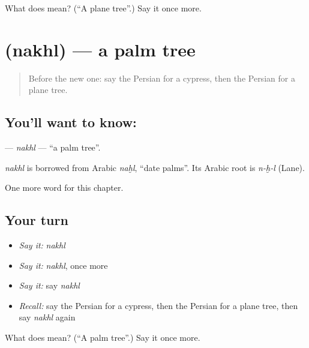 \begin{tcolorbox}[breakable,colback=teal!4,colframe=teal!35!black,title={Before you move on}]
What does  mean? (\textquotedblleft{}A plane tree\textquotedblright{}.) Say it once more.
\end{tcolorbox}
\section[\texorpdfstring{\fa{نخل} (nakhl)}{نخل (nakhl)}]{ (nakhl) — a palm tree}

\label{lesson:FA-C279-nakhl}



\begin{quote}
Before the new one: say the Persian for a cypress, then the Persian for a plane tree.
\end{quote}

\subsection*{You'll want to know: }
\textbf{} — \emph{nakhl} — \textquotedblleft{}a palm tree\textquotedblright{}.

\begin{cousinweb}
\emph{nakhl} is borrowed from Arabic \emph{naḫl}, \textquotedblleft{}date palms\textquotedblright{}. Its Arabic root is \emph{n-ḫ-l} (Lane).
\end{cousinweb}

\begin{grammarlens}[title={What you've built}]
One more word for this chapter.
\end{grammarlens}

\subsection*{Your turn}
\begin{itemize}
\raggedright
  \item \emph{Say it:} \emph{nakhl}
  \item \emph{Say it:} \emph{nakhl}, once more
  \item \emph{Say it:} say \emph{nakhl}
  \item \emph{Recall:} say the Persian for a cypress, then the Persian for a plane tree, then say \emph{nakhl} again
\end{itemize}

\begin{tcolorbox}[breakable,colback=teal!4,colframe=teal!35!black,title={Before you move on}]
What does  mean? (\textquotedblleft{}A palm tree\textquotedblright{}.) Say it once more.
\end{tcolorbox}
